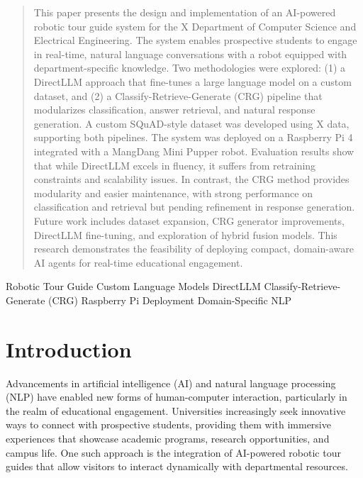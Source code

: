 \documentclass[conference]{IEEEtran}
\begin{document}
\begin{abstract}
    This paper presents the design and implementation of an AI-powered robotic tour guide system for the X Department of Computer Science and Electrical Engineering. 
    The system enables prospective students to engage in real-time, natural language conversations with a robot equipped with department-specific knowledge. 
    Two methodologies were explored: (1) a DirectLLM approach that fine-tunes a large language model on a custom dataset, and (2) a Classify-Retrieve-Generate (CRG) pipeline that modularizes classification, answer retrieval, and natural response generation. 
    A custom SQuAD-style dataset was developed using X data, supporting both pipelines. 
    The system was deployed on a Raspberry Pi 4 integrated with a MangDang Mini Pupper robot. 
    Evaluation results show that while DirectLLM excels in fluency, it suffers from retraining constraints and scalability issues. 
    In contrast, the CRG method provides modularity and easier maintenance, with strong performance on classification and retrieval but pending refinement in response generation. 
    Future work includes dataset expansion, CRG generator improvements, DirectLLM fine-tuning, and exploration of hybrid fusion models. 
    This research demonstrates the feasibility of deploying compact, domain-aware AI agents for real-time educational engagement.
\end{abstract}

\begin{IEEEkeywords}
    Robotic Tour Guide
    Custom Language Models
    DirectLLM
    Classify-Retrieve-Generate (CRG)
    Raspberry Pi Deployment
    Domain-Specific NLP
\end{IEEEkeywords}

\section{Introduction}
Advancements in artificial intelligence (AI) and natural language processing (NLP) have enabled new forms of human-computer interaction, particularly in the realm of educational engagement. 
Universities increasingly seek innovative ways to connect with prospective students, providing them with immersive experiences that showcase academic programs, research opportunities, and campus life. 
One such approach is the integration of AI-powered robotic tour guides that allow visitors to interact dynamically with departmental resources.
\end{document}
